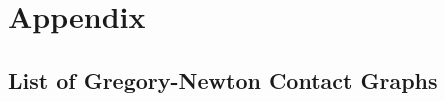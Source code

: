 
\part{Appendix}
\label{sec:appendix}

\appendix

\chapter{List of Gregory-Newton Contact Graphs}
\label{sec:listofgregorynewtonshells}


